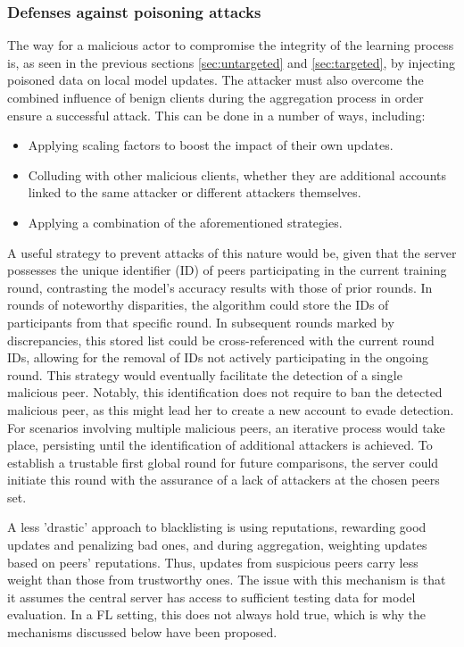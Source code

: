 \subsubsection{Defenses against poisoning attacks}\label{sec:defenses}
The way for a malicious actor to compromise the integrity of the learning process is, as seen in the previous sections \ref{sec:untargeted} and \ref{sec:targeted}, by injecting poisoned data on local model updates. The attacker must also overcome the combined influence of benign clients during the aggregation process in order ensure a successful attack. This can be done in a number of ways, including:
\begin{itemize}
        \item Applying scaling factors to boost the impact of their own updates.
        \item Colluding with other malicious clients, whether they are additional accounts linked to the same attacker or different attackers themselves.
        \item Applying a combination of the aforementioned strategies.
\end{itemize}

A useful strategy to prevent attacks of this nature would be, given that the server possesses the unique identifier (ID) of peers participating in the current training round, contrasting the model's accuracy results with those of prior rounds. In rounds of noteworthy disparities, the algorithm could store the IDs of participants from that specific round. In subsequent rounds marked by discrepancies, this stored list could be cross-referenced with the current round IDs, allowing for the removal of IDs not actively participating in the ongoing round. This strategy would eventually facilitate the detection of a single malicious peer. Notably, this identification does not require to ban the detected malicious peer, as this might lead her to create a new account to evade detection.
For scenarios involving multiple malicious peers, an iterative process would take place, persisting until the identification of additional attackers is achieved. To establish a trustable first global round for future comparisons, the server could initiate this round with the assurance of a lack of attackers at the chosen peers set.


A less 'drastic' approach to blacklisting is using reputations, rewarding good updates and penalizing bad ones, and during aggregation, weighting updates based on peers' reputations. Thus, updates from suspicious peers carry less weight than those from trustworthy ones.
The issue with this mechanism is that it assumes the central server has access to sufficient testing data for model evaluation. In a FL setting, this does not always hold true, which is why the mechanisms discussed below have been proposed.



